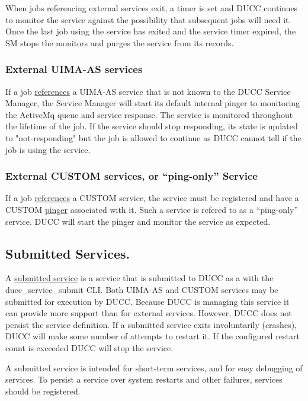       When jobs referencing external services exit, a timer is set and DUCC continues to monitor the
      service against the possibility that subsequent jobs will need it. Once the last job using the
      service has exited and the service timer expired, the SM stops the monitors and purges the
      service from its records.

      \subsubsection{External UIMA-AS services}
      If a job \hyperref[sec:service.endpoints]{references} a UIMA-AS service that is not known to the
      DUCC Service Manager, the Service Manager will start
      its default internal pinger to monitoring the ActiveMq queue and service response.  The
      service is monitored throughout the lifetime of the job. If the service should stop
      responding, its state is updated to "not-responding" but the job is allowed to continue as
      DUCC cannot tell if the job is using the service.

      \subsubsection{External CUSTOM services, or ``ping-only'' Service} 
      If a job \hyperref[sec:service.endpoints]{references} a CUSTOM service, the service must be
      registered and have a CUSTOM \hyperref[sec:service.pingers]{pinger} associated with it. Such a
      service is refered to as a ``ping-only'' service.  DUCC will start the pinger and monitor the
      service as expected.
      
      
      \subsection{Submitted Services.} A \hyperref[sec:cli.service-submit]{submitted service} is a
      service that is submitted to DUCC as a with the ducc\_service\_submit CLI.  Both UIMA-AS and
      CUSTOM services may be submitted for execution by DUCC. Because DUCC is managing this service
      it can provide more support than for external services.  However, DUCC does not persist the
      service definition. If a submitted service exits involuntarily (crashes), DUCC will make
      some number of attempts to restart it.  If the configured restart count is exceeded DUCC
      will stop the service.

      A submitted service is intended for short-term services, and for easy debugging of services.
      To persist a service over system restarts and other failures, services should be registered.
      
